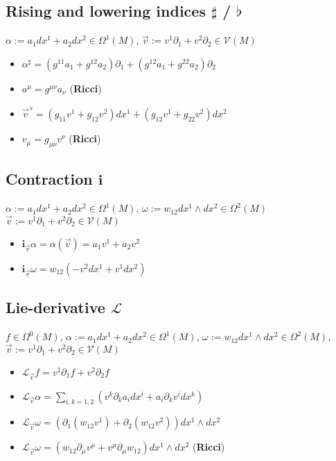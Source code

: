 \documentclass{scrartcl}
\newcommand{\vecflat}[1]{\vec{#1}^{\,\flat}}
\renewcommand{\i}{\mathbf{i}}
\renewcommand{\L}{\mathbf{\mathcal{L}}}
\begin{document}
    \subsection{Rising and lowering indices \( \sharp \) / \( \flat \)}
      \( \alpha:= a_{1}dx^{1} + a_{2}dx^{2} \in \Omega^{1}(M) \),
      \( \vec{v} := v^{1}\partial_{1} + v^{2}\partial_{2}\in\mathcal{V}(M) \)
      \begin{itemize}
        \item \( \alpha^{\sharp} = \left( g^{11}a_{1}+g^{12}a_{2} \right)\partial_{1} + \left( g^{12}a_{1}+g^{22}a_{2} \right)\partial_{2}\)
        \item \( a^{\mu} = g^{\mu\nu}a_{\nu}\) (\textbf{Ricci})
        \item \( \vecflat{v} = \left( g_{11}v^{1} + g_{12}v^{2} \right)dx^{1} + \left( g_{12}v^{1} + g_{22}v^{2} \right)dx^{2} \)
        \item \( v_{\mu} = g_{\mu\nu}v^{\nu} \) (\textbf{Ricci})
      \end{itemize}

    \subsection{Contraction \( \i \)}
      \( \alpha:= a_{1}dx^{1} + a_{2}dx^{2} \in \Omega^{1}(M) \),
      \( \omega:= w_{12}dx^{1}\wedge dx^{2} \in \Omega^{2}(M)\)
      \( \vec{v} := v^{1}\partial_{1} + v^{2}\partial_{2}\in\mathcal{V}(M) \)
      \begin{itemize}
        \item \( \i_{\vec{v}}\alpha = \alpha\left( \vec{v} \right) = a_{1}v^{1} + a_{2}v^{2} \)
        \item \( \i_{\vec{v}}\omega = w_{12}\left( -v^{2}dx^{1} + v^{1}dx^{2} \right) \)
      \end{itemize}

    \subsection{Lie-derivative \( \L \)}
       \( f\in \Omega^{0}(M)\),
       \( \alpha:= a_{1}dx^{1} + a_{2}dx^{2} \in \Omega^{1}(M) \),
       \( \omega:= w_{12}dx^{1}\wedge dx^{2} \in \Omega^{2}(M) \),
       \( \vec{v} := v^{1}\partial_{1} + v^{2}\partial_{2}\in\mathcal{V}(M) \)
       \begin{itemize}
        \item \( \L_{\vec{v}}f = v^{1}\partial_{1}f + v^{2}\partial_{2}f \)
        \item \( \L_{\vec{v}}\alpha = \sum_{i,k=1,2} \left(v^{k}\partial_{k}a_{i}dx^{i} + a_{i}\partial_{k}v^{i}dx^{k}\right) \)
        \item \( \L_{\vec{v}}\omega = \left( \partial_{1}\left( w_{12}v^{1} \right) 
                                        +  \partial_{2}\left( w_{12}v^{2} \right)\right) dx^{1}\wedge dx^{2}\)
        \item \( \L_{\vec{v}}\omega = \left(w_{12}\partial_{\mu}v^{\mu} + v^{\mu}\partial_{\mu}w_{12}\right) dx^{1}\wedge dx^{2} \)
           (\textbf{Ricci})
       \end{itemize}
\end{document}
